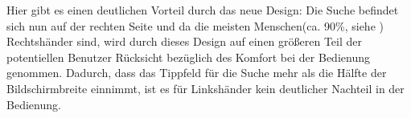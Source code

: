 Hier gibt es einen deutlichen Vorteil durch das neue Design: Die Suche befindet sich nun auf der rechten Seite und da die meisten Menschen(ca. 90\%, siehe \cite{Handedness}) Rechtshänder sind, wird durch dieses Design auf einen größeren Teil der potentiellen Benutzer Rücksicht bezüglich des Komfort bei der Bedienung genommen. Dadurch, dass das Tippfeld für die Suche mehr als die Hälfte der Bildschirmbreite einnimmt, ist es für Linkshänder kein deutlicher Nachteil in der Bedienung.

